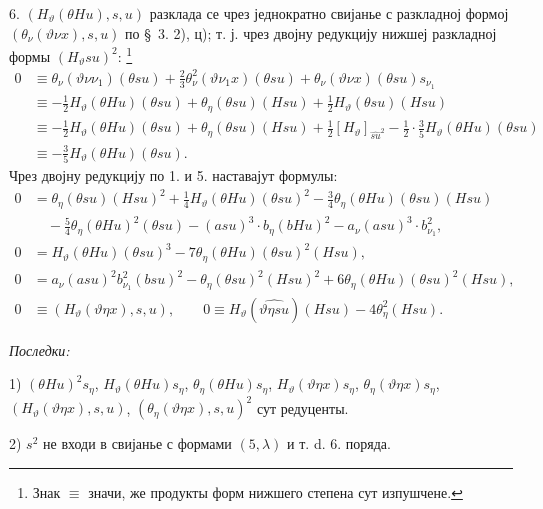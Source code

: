 ﻿\documentclass[11pt]{article}
\begin{document}
6. $(H_\vartheta(\theta Hu),s,u)$ разклада се чрез једнократно свијанье с разкладној формој $(\theta_{\nu}(\vartheta\nu x),s,u)$ по \S\ 3. 2), ц); т. ј. чрез двојну редукцију нижшеј разкладној формы $(H_\vartheta su)^2$: \footnote{Знак $\equiv$ значи, же продукты форм нижшего степена сут изпушчене.}
\[
\begin{aligned}
0&\equiv \theta_{\nu}(\vartheta\nu\nu_1)(\theta su)+\frac23\theta_{\nu}^2(\vartheta\nu_1x)(\theta su)+\theta_{\nu}(\vartheta\nu x)(\theta su)s_{\nu_1}\\
&\equiv -\frac12H_\vartheta(\theta Hu)(\theta su)+\theta_\eta(\theta su)(Hsu)+\frac12H_\vartheta(\theta su)(Hsu)\\
&\equiv -\frac12H_\vartheta(\theta Hu)(\theta su)+\theta_\eta(\theta su)(Hsu)+\frac12[H_\vartheta]_{\widehat{su}^2}-\frac12\cdot\frac35H_\vartheta(\theta Hu)(\theta su)\\
&\equiv -\frac35H_\vartheta(\theta Hu)(\theta su).
\end{aligned}
\]
Чрез двојну редукцију по 1. и 5. наставајут формулы:
\enlargethispage{\baselineskip}
\begin{align*}
0&=\theta_\eta(\theta su)(Hsu)^2+\frac14H_\vartheta(\theta Hu)(\theta su)^2-\frac34\theta_\eta(\theta Hu)(\theta su)(Hsu)\\
&\quad-\frac54\theta_\eta(\theta Hu)^2(\theta su)-(asu)^3\cdot b_\eta(bHu)^2-a_{\nu}(asu)^3\cdot b_{\nu_1}^2,\\
0&=H_\vartheta(\theta Hu)(\theta su)^3-7\theta_\eta(\theta Hu)(\theta su)^2(Hsu),\tag{31}\\
0&=a_{\nu}(asu)^2b_{\nu_1}^{2}(bsu)^2-\theta_\eta(\theta su)^2(Hsu)^2+6\theta_\eta(\theta Hu)(\theta su)^2(Hsu),\\
0&\equiv (H_\vartheta(\vartheta\eta x),s,u),\qquad
0\equiv H_\vartheta(\widehat{\vartheta\eta su})(Hsu)-4\theta_\eta^2(Hsu).
\end{align*}

\noindent\textit{Последки:}

1) $(\theta Hu)^2s_\eta$, $H_\vartheta(\theta Hu)s_\eta$, $\theta_\eta(\theta Hu)s_\eta$, $H_\vartheta(\vartheta\eta x)s_\eta$, $\theta_\eta(\vartheta\eta x)s_\eta$, $(H_\vartheta(\vartheta\eta x),s,u)$, $(\theta_\eta(\vartheta\eta x),s,u)^2$ сут редуценты.

2) $s^2$ не входи в свијанье с формами $(5,\lambda)$ и т. d. 6. поряда.
\end{document}
